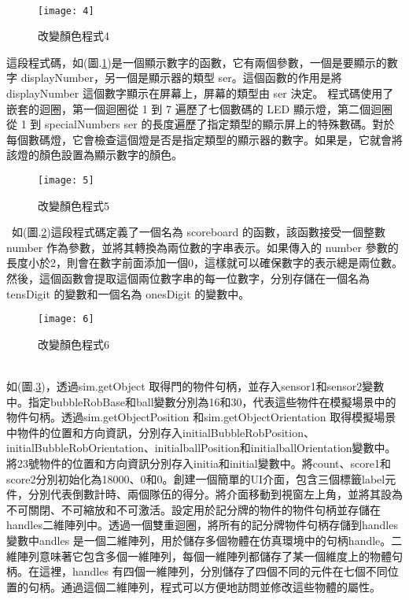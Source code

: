 \\
\begin{figure}[hbt!]
\begin{center}
\texttt{[image: 4]}
\caption{\Large 改變顏色程式4}\label{改變顏色程式4}
\end{center}
\end{figure} 
這段程式碼，如(圖.\ref{改變顏色程式4})是一個顯示數字的函數，它有兩個參數，一個是要顯示的數字 displayNumber，另一個是顯示器的類型 ser。這個函數的作用是將 displayNumber 這個數字顯示在屏幕上，屏幕的類型由 ser 決定。 程式碼使用了嵌套的迴圈，第一個迴圈從 1 到 7 遍歷了七個數碼的 LED 顯示燈，第二個迴圈從 1 到 specialNumbers ser 的長度遍歷了指定類型的顯示屏上的特殊數碼。對於每個數碼燈，它會檢查這個燈是否是指定類型的顯示器的數字。如果是，它就會將該燈的顏色設置為顯示數字的顏色。\\
\newpage
\begin{figure}[hbt!]
\begin{center}
\texttt{[image: 5]}
\caption{\Large 改變顏色程式5}\label{改變顏色程式5}
\end{center}
\end{figure}\
如(圖.\ref{改變顏色程式5})這段程式碼定義了一個名為 scoreboard 的函數，該函數接受一個整數 number 作為參數，並將其轉換為兩位數的字串表示。如果傳入的 number 參數的長度小於2，則會在數字前面添加一個0，這樣就可以確保數字的表示總是兩位數。然後，這個函數會提取這個兩位數字串的每一位數字，分別存儲在一個名為 tensDigit 的變數和一個名為 onesDigit 的變數中。\
\begin{figure}[hbt!]
\begin{center}
\texttt{[image: 6]}
\caption{\Large 改變顏色程式6}\label{改變顏色程式6}
\end{center}
\end{figure}\\
如(圖.\ref{改變顏色程式6})，透過sim.getObject 取得門的物件句柄，並存入sensor1和sensor2變數中。指定bubbleRobBase和ball變數分別為16和30，代表這些物件在模擬場景中的物件句柄。透過sim.getObjectPosition 和sim.getObjectOrientation 取得模擬場景中物件的位置和方向資訊，分別存入initialBubbleRobPosition、initialBubbleRobOrientation、initialballPosition和initialballOrientation變數中。將23號物件的位置和方向資訊分別存入initia和initial變數中。將count、score1和score2分別初始化為18000、0和0。創建一個簡單的UI介面，包含三個標籤label元件，分別代表倒數計時、兩個隊伍的得分。將介面移動到視窗左上角，並將其設為不可關閉、不可縮放和不可激活。設定用於記分牌的物件的物件句柄並存儲在handles二維陣列中。透過一個雙重迴圈，將所有的記分牌物件句柄存儲到handles變數中andles 是一個二維陣列，用於儲存多個物體在仿真環境中的句柄handle。二維陣列意味著它包含多個一維陣列，每個一維陣列都儲存了某一個維度上的物體句柄。在這裡，handles 有四個一維陣列，分別儲存了四個不同的元件在七個不同位置的句柄。通過這個二維陣列，程式可以方便地訪問並修改這些物體的屬性。\
